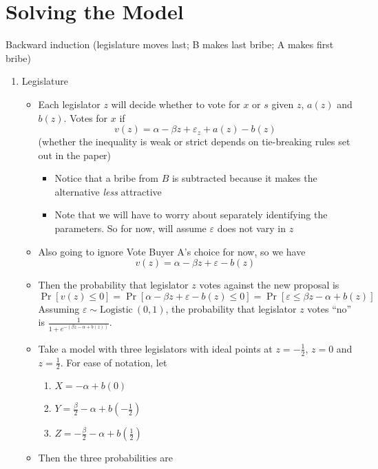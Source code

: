\documentclass[12pt]{article}
\newcommand{\ve}{\varepsilon}
\begin{document}
\newpage
\section{Solving the Model}
\label{sec:solve}
Backward induction (legislature moves last; B makes last bribe; A makes first bribe)
\begin{enumerate}
	\item Legislature
		\begin{itemize}
			\item Each legislator $z$ will decide whether to vote for $x$ or $s$ given $z$, $a(z)$ and $b(z)$. Votes for $x$ if
			  \[
				  v(z) = \alpha -\beta z + \ve_z + a(z) - b(z)
				\]
				(whether the inequality is weak or strict depends on tie-breaking rules set out in the paper)
					\begin{itemize}
						\item Notice that a bribe from $B$ is subtracted because it makes the alternative \textit{less} attractive
						\item Note that we will have to worry about separately identifying the parameters. So for now, will assume $\ve$ does not vary in $z$
					\end{itemize}
			\item Also going to ignore Vote Buyer A's choice for now, so we have
				\[
					v(z) = \alpha -\beta z + \ve - b(z)
				\]
			\item Then the probability that legislator $z$ votes against the new proposal is
				\[
					\Pr\left[v(z)\leq 0 \right] = \Pr\left[\alpha -\beta z + \ve - b(z) \leq 0 \right] 
			                            = \Pr\left[\ve \leq \beta z - \alpha + b(z) \right] 
				\]
				Assuming $\ve \sim \text{Logistic} \ (0,1)$, the probability that legislator $z$ votes ``no'' is $\frac{1}{1+e^{-\left(\beta z - \alpha + b(z) \right)}}$.
			\item Take a model with three legislators with ideal points at $z=-\frac{1}{2}$, $z=0$ and $z=\frac{1}{2}$. For ease of notation, let
				\begin{enumerate}
					\item $X = -\alpha + b(0)$ 
					\item $Y = \frac{\beta}{2} - \alpha + b\left(-\frac{1}{2}\right)$
					\item $Z = -\frac{\beta}{2} - \alpha + b\left(\frac{1}{2}\right)\label{page:sh}$ 
				\end{enumerate}
			\item Then the three probabilities are
				\begin{itemize}

\end{itemize}
\end{itemize}
\end{enumerate}
\end{document}
